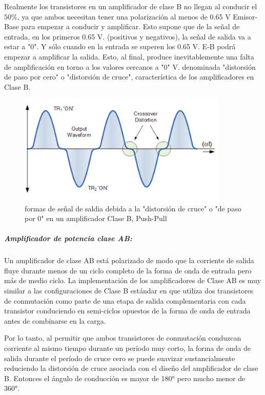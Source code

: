 Realmente los transistores en un amplificador de clase B no llegan al conducir el $50\%$, ya que ambos necesitan tener una polarización al menos de 0.65 V Emisor-Base para empezar a conducir y amplificar. Esto supone que de la señal de entrada, en los primeros 0.65 V. (positivos y negativos), la señal de salida va a estar a "0". Y sólo cuando en la entrada se superen los 0.65 V. E-B podrá empezar a amplificar la salida. Esto, al final, produce inevitablemente una falta de amplificación en torno a los valores cercanos a "0" V. denominada "distorsión de paso por cero" o "distorsión de cruce", característica de los amplificadores en Clase B.

\begin{figure}[H]
    \centering
    \includegraphics[width=10cm]{Imagenes/crossover.png}
    \caption{formas de señal de saldia debida a la "distorsión de cruce"    o     "de paso por 0" en un amplificador Clase B, Push-Pull}
    \label{fig:crossover}
\end{figure}

\subparagraph{Amplificador de potencia clase AB:}

Un amplificador de clase AB está polarizado de modo que la corriente de salida fluye durante menos de un ciclo completo de la forma de onda de entrada pero más de medio ciclo. La implementación de los amplificadores de Clase AB es muy similar a las configuraciones de Clase B estándar en que utiliza dos transistores de conmutación como parte de una etapa de salida complementaria con cada transistor conduciendo en semi-ciclos opuestos de la forma de onda de entrada antes de combinarse en la carga.

Por lo tanto, al permitir que ambos transistores de conmutación conduzcan corriente al mismo tiempo durante un período muy corto, la forma de onda de salida durante el período de cruce cero se puede suavizar sustancialmente reduciendo la distorsión de cruce asociada con el diseño del amplificador de clase B. Entonces el ángulo de conducción es mayor de 180° pero mucho menor de 360°.


